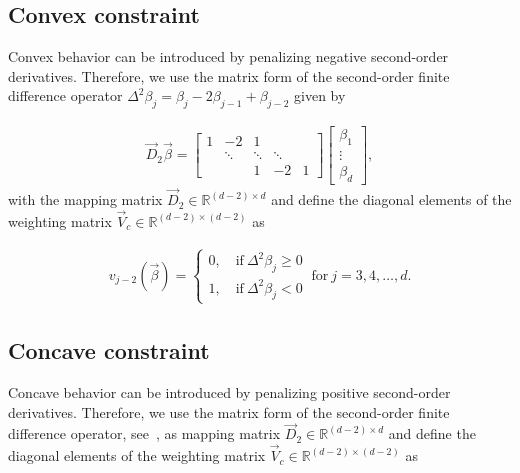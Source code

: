 \subsection{Convex constraint} \label{subsec:ConvC}

Convex behavior can be introduced by penalizing negative second-order derivatives. Therefore, we  use the matrix form of the second-order finite difference operator $\Delta^2 \beta_j = \beta_j - 2\beta_{j-1} + \beta_{j-2}$ given by

\begin{align} \label{eq:FD-operator-order-2}
	\vec{D}_2 \vec{\beta} = 
	\begin{bmatrix} 
		1& -2     & 1   \\  
		 & \ddots & \ddots  & \ddots \\ 
		 &        & 1       & -2     & 1 
	\end{bmatrix} \begin{bmatrix}
		\beta_1 \\
		\vdots \\
		\beta_d
	\end{bmatrix},
\end{align}
%
with the mapping matrix $\vec{D}_2 \in \mathbb{R}^{(d-2)\times d}$ and define the diagonal elements of the weighting matrix $\vec{V}_c \in \mathbb{R}^{(d-2) \times (d-2)}$ as

\begin{align} \label{eq:weighting-matrix-conv-diagonal}
	v_{j-2}(\vec{\beta}) = \begin{cases}
		0, \quad \text{if} \ \Delta^2\beta_j \ge 0 \\ 
		1, \quad \text{if} \ \Delta^2\beta_j < 0
	\end{cases}	\ \text{for} \ j=3,4, \dots, d.
\end{align}

\subsection{Concave constraint} \label{subsec:ConcC}

Concave behavior can be introduced by penalizing positive second-order derivatives. Therefore, we  use the matrix form of the second-order finite difference operator, see~, as mapping matrix $\vec{D}_2 \in \mathbb{R}^{(d-2)\times d}$ and define the diagonal elements of the weighting matrix $\vec{V}_c \in \mathbb{R}^{(d-2) \times (d-2)}$ as

